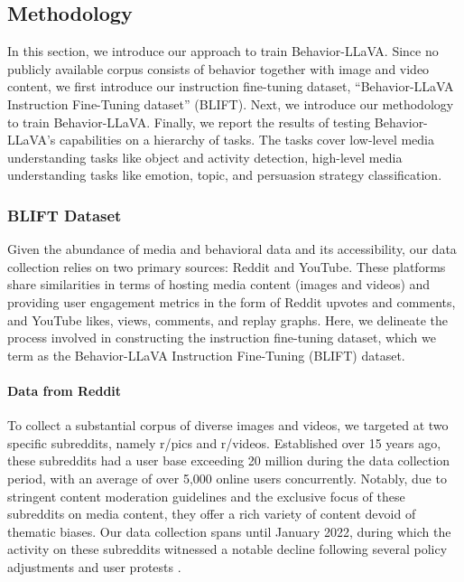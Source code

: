 \subsection{Methodology}
\label{sec:methodology}
In this section, we introduce our approach to train Behavior-LLaVA. Since no publicly available corpus consists of behavior together with image and video content, we first introduce our instruction fine-tuning dataset, ``Behavior-LLaVA Instruction Fine-Tuning dataset'' (BLIFT). Next, we introduce our methodology to train Behavior-LLaVA. Finally, we report the results of testing Behavior-LLaVA's capabilities on a hierarchy of tasks. The tasks cover low-level media understanding tasks like object and activity detection, high-level media understanding tasks like emotion, topic, and persuasion strategy classification. 


\subsubsection{BLIFT Dataset}
Given the abundance of media and behavioral data and its accessibility, our data collection relies on two primary sources: Reddit and YouTube. These platforms share similarities in terms of hosting media content (images and videos) and providing user engagement metrics in the form of Reddit upvotes and comments, and YouTube likes, views, comments, and replay graphs. Here, we delineate the process involved in constructing the instruction fine-tuning dataset, which we term as the Behavior-LLaVA Instruction Fine-Tuning (BLIFT) dataset.



\paragraph{Data from Reddit} To collect a substantial corpus of diverse images and videos, we targeted at two specific subreddits, namely r/pics and r/videos. Established over 15 years ago, these subreddits had a user base exceeding 20 million during the data collection period, with an average of over 5,000 online users concurrently. Notably, due to stringent content moderation guidelines \cite{reddit_content_policy,reddit_pics_rule8,reddit_pics_wiki_index,reddit_videos_rules} and the exclusive focus of these subreddits on media content, they offer a rich variety of content devoid of thematic biases. Our data collection spans until January 2022, during which the activity on these subreddits witnessed a notable decline following several policy adjustments and user protests \cite{guardian_reddit_protest,economist_reddit_protest}.


